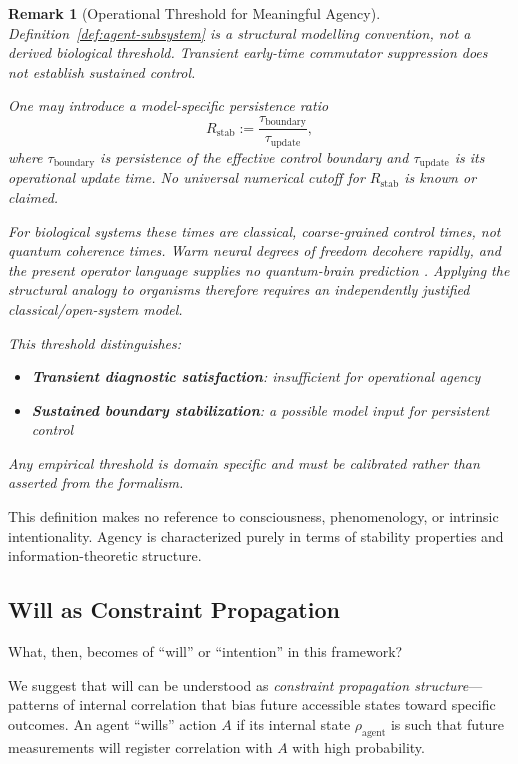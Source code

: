 \documentclass[11pt,a4paper]{article}
\newtheorem{remark}[definition]{Remark}
\begin{document}
\begin{remark}[Operational Threshold for Meaningful Agency]
\label{rem:agency-threshold}
Definition~\ref{def:agent-subsystem} is a structural modelling convention, not a derived biological threshold.  Transient early-time commutator suppression does not establish sustained control.

One may introduce a model-specific persistence ratio
\begin{equation}
R_{\mathrm{stab}}:=\frac{\tau_{\mathrm{boundary}}}{\tau_{\mathrm{update}}},
\end{equation}
where $\tau_{\mathrm{boundary}}$ is persistence of the effective control boundary and $\tau_{\mathrm{update}}$ is its operational update time.  No universal numerical cutoff for $R_{\mathrm{stab}}$ is known or claimed.

For biological systems these times are classical, coarse-grained control times, not quantum coherence times.  Warm neural degrees of freedom decohere rapidly, and the present operator language supplies no quantum-brain prediction \cite{Tegmark2000}.  Applying the structural analogy to organisms therefore requires an independently justified classical/open-system model.

This threshold distinguishes:
\begin{itemize}
\item \textbf{Transient diagnostic satisfaction}: insufficient for operational agency
\item \textbf{Sustained boundary stabilization}: a possible model input for persistent control
\end{itemize}

Any empirical threshold is domain specific and must be calibrated rather than asserted from the formalism.
\end{remark}

This definition makes no reference to consciousness, phenomenology, or intrinsic intentionality. Agency is characterized purely in terms of stability properties and information-theoretic structure.

\subsection{Will as Constraint Propagation}
\label{sec:II.3}

What, then, becomes of ``will'' or ``intention'' in this framework?

We suggest that will can be understood as \emph{constraint propagation structure}—patterns of internal correlation that bias future accessible states toward specific outcomes. An agent ``wills'' action $A$ if its internal state $\rho_{\text{agent}}$ is such that future measurements will register correlation with $A$ with high probability.
\end{document}
